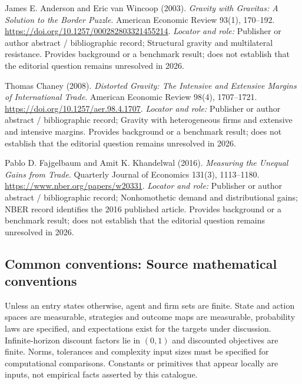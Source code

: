 \documentclass[11pt,a4paper]{article}
\begin{document}
\begin{enumerate}[label={[S\arabic*]},leftmargin=*]

\item James E. Anderson and Eric van Wincoop (2003). \emph{Gravity with Gravitas: A Solution to the Border Puzzle}. American Economic Review 93(1), 170–192. \url{https://doi.org/10.1257/000282803321455214}.
\textit{Locator and role:} Publisher or author abstract / bibliographic record; Structural gravity and multilateral resistance. Provides background or a benchmark result; does not establish that the editorial question remains unresolved in 2026.

\item Thomas Chaney (2008). \emph{Distorted Gravity: The Intensive and Extensive Margins of International Trade}. American Economic Review 98(4), 1707–1721. \url{https://doi.org/10.1257/aer.98.4.1707}.
\textit{Locator and role:} Publisher or author abstract / bibliographic record; Gravity with heterogeneous firms and extensive and intensive margins. Provides background or a benchmark result; does not establish that the editorial question remains unresolved in 2026.

\item Pablo D. Fajgelbaum and Amit K. Khandelwal (2016). \emph{Measuring the Unequal Gains from Trade}. Quarterly Journal of Economics 131(3), 1113–1180. \url{https://www.nber.org/papers/w20331}.
\textit{Locator and role:} Publisher or author abstract / bibliographic record; Nonhomothetic demand and distributional gains; NBER record identifies the 2016 published article. Provides background or a benchmark result; does not establish that the editorial question remains unresolved in 2026.

\end{enumerate}

\subsection*{Common conventions: Source mathematical conventions}

Unless an entry states otherwise, agent and firm sets are finite. State and action spaces are measurable, strategies and outcome maps are measurable, probability laws are specified, and expectations exist for the targets under discussion. Infinite-horizon discount factors lie in $(0,1)$ and discounted objectives are finite. Norms, tolerances and complexity input sizes must be specified for computational comparisons. Constants or primitives that appear locally are inputs, not empirical facts asserted by this catalogue.
\end{document}

